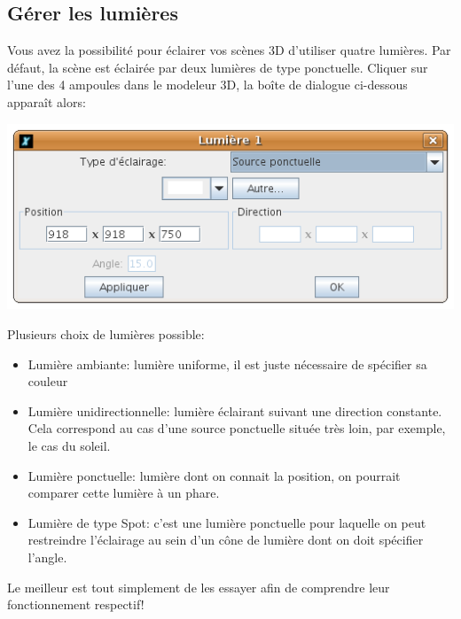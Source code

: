 \subsection{Gérer les lumières}
Vous avez la possibilité pour éclairer vos scènes 3D d'utiliser quatre lumières. Par défaut, la scène est éclairée par deux lumières de type ponctuelle. Cliquer sur l'une des 4 ampoules dans le modeleur 3D, la boîte de dialogue ci-dessous apparaît alors:
\begin{center}
 \includegraphics*[scale=0.6]{images/CaptureLight.png}
\end{center}
Plusieurs choix de lumières possible:
\begin{itemize}
\item Lumière ambiante: lumière uniforme, il est juste nécessaire de spécifier sa couleur
\item Lumière unidirectionnelle: lumière éclairant suivant une direction constante. Cela correspond au cas d'une source ponctuelle située très loin, par exemple, le cas du soleil.
\item Lumière ponctuelle: lumière dont on connait la position, on pourrait comparer cette lumière à un phare.
\item Lumière de type \og Spot\fg: c'est une lumière ponctuelle pour laquelle on peut restreindre l'éclairage au sein d'un cône de lumière dont on doit spécifier l'angle.
\end{itemize}
Le meilleur est tout simplement de les essayer afin de comprendre leur fonctionnement respectif!

